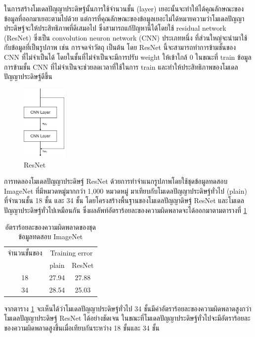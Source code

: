 ในการสร้างโมเดลปัญญาประดิษฐ์นั้นการใช้จำนวนชั้น (layer) เยอะนั้นจะทำให้ได้คุณลักษณะของข้อมูลที่ออกมาเยอะตามไปด้วย 
แต่การที่คุณลักษณะของข้อมูลเยอะไม่ได้หมายความว่าโมเดลปัญญาประดิษฐ์จะให้ประสิทธิภาพที่ดีเสมอไป ซึ่งสามารถแก้ปัญหานี้ได้โดยใช้ residual network (ResNet) 
ซึ่งเป็น convolution neuron network (CNN) ประเภทหนึ่ง ที่ส่วนใหญ่จะนำมาใช้กับข้อมูลที่เป็นรูปภาพ เช่น การจดจำวัตถุ เป็นต้น โดย ResNet นี้จะสามารถทำการข้ามชั้นของ CNN ที่ไม่จำเป็นได้ โดยในชั้นที่ไม่จำเป็นจะมีการปรับ weight ให้เข้าใกล้ 0 ในขณะที่ train ข้อมูล การข้ามชั้น CNN ที่ไม่จำเป็นจะช่วยลดเวลาที่ใช้ในการ train และทำให้ประสิทธิภาพของโมเดลปัญญาประดิษฐ์ดีขึ้น

\begin{figure}[!ht]
	\centering
	\includegraphics[width=0.2\textwidth]{chapter2/images/example_resnet.png}
		\caption{ResNet}
    	\label{fig:ResNet}
\end{figure}

การทดลองโมเดลปัญญาประดิษฐ์ ResNet ด้วยการทำจำแนกรูปภาพโดยใช้ชุดข้อมูลทดสอบ ImageNet ที่มีหมวดหมู่มากกว่า 1,000 หมวดหมู่
มาเทียบกับโมเดลปัญญาประดิษฐ์ทั่วไป (plain) ที่จำนวนชั้น 18 ชั้น และ 34 ชั้น โดยโครงสร้างพื้นฐานของโมเดลปัญญาดิษฐ์ ResNet และโมเดลปัญญาประดิษฐ์ทั่วไปเหมือนกัน 
ซึ่งผลลัพท์อัตราร้อยละของความผิดพลาดจะได้ออกมาตามตารางที่ \ref{tab: Top-1 error of ImageNet} 

\begin{table}[!ht]
	\centering
	\begin{tabular}{|c|c|c|}
		\hline
		{จำนวนชั้นของ}&\multicolumn{2}{c|}{Training error}\\
		\cline{2-3}
		{}							& plain						& ResNet			\\
		\hline
		18							& 27.94						& 27.88				\\
		34							& 28.54						& 25.03				\\
		\hline
	\end{tabular}
	\caption{อัตราร้อยละของความผิดพลาดของชุดข้อมูลทดสอบ ImageNet}
	\label{tab: Top-1 error of ImageNet}
\end{table}
\clearpage

จากตาราง \ref{tab: Top-1 error of ImageNet} จะเห็นได้ว่าโมเดลปัญญาประดิษฐ์ทั่วไป 34 ชั้นมีค่าอัตราร้อยละของความผิดพลาดสูงกว่าโมเดลปัญญาประดิษฐ์ ResNet 
ได้อย่างชัดเจน ในขณะที่โมเดลปัญญาประดิษฐ์ทั่วไปจะมีอัตราร้อยละของความผิดพลาดสูงขึ้นเมื่อเทียบกันระหว่าง 18 ชั้นและ 34 ชั้น


